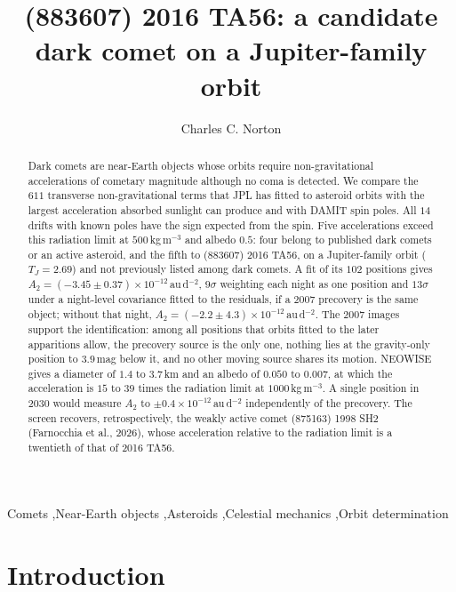 \documentclass[3p,11pt]{elsarticle}
\begin{document}
\begin{frontmatter}

\title{(883607) 2016 TA56: a candidate dark comet on a Jupiter-family orbit}

\author{Charles C. Norton}

\begin{abstract}
Dark comets are near-Earth objects whose orbits require non-gravitational accelerations
of cometary magnitude although no coma is detected. We compare the $611$ transverse
non-gravitational terms that JPL has fitted to asteroid orbits with the largest
acceleration absorbed sunlight can produce and with DAMIT spin poles. All $14$ drifts with
known poles have the sign expected from the spin. Five accelerations exceed this
radiation limit at $500$\,kg\,m$^{-3}$ and albedo $0.5$: four belong to published dark
comets or an active asteroid, and the fifth to (883607) 2016 TA56, on a Jupiter-family
orbit ($T_J=2.69$) and not previously listed among dark comets. A fit of its $102$
positions gives $A_2=(-3.45\pm0.37)\times10^{-12}$\,au\,d$^{-2}$, $9\sigma$ weighting each
night as one position and $13\sigma$ under a night-level covariance fitted to the
residuals, if a 2007 precovery is the same object; without that night,
$A_2=(-2.2\pm4.3)\times10^{-12}$\,au\,d$^{-2}$. The 2007 images support the
identification: among all positions that orbits fitted to the later apparitions allow,
the precovery source is the only one, nothing lies at the gravity-only position to
$3.9$\,mag below it, and no other moving source shares its motion. NEOWISE gives a
diameter of $1.4$ to $3.7$\,km and an albedo of $0.050$ to $0.007$, at which the
acceleration is $15$ to $39$ times the radiation limit at $1000$\,kg\,m$^{-3}$. A single
position in 2030 would measure $A_2$ to $\pm0.4\times10^{-12}$\,au\,d$^{-2}$ independently of
the precovery. The screen recovers, retrospectively, the weakly active comet (875163)
1998 SH2 (Farnocchia et al., 2026), whose acceleration relative to the radiation limit is
a twentieth of that of 2016 TA56.
\end{abstract}

\begin{keyword}
Comets \sep Near-Earth objects \sep Asteroids \sep Celestial mechanics \sep Orbit determination
\end{keyword}

\end{frontmatter}

\section{Introduction}\label{sec:intro}
\end{document}
